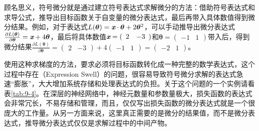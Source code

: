 \vspace{0.5em}

\parinterval 顾名思义，符号微分就是通过建立符号表达式求解微分的方法：借助符号表达式和求导公式，推导出目标函数关于自变量的微分表达式，最后再带入具体数值得到微分结果。例如，对于表达式$ L({\bm \theta})={\textbf{\em x}}\cdot {\bm \theta}+2{\bm \theta}^2 $，可以手动推导出微分表达式$ \frac{\partial L({\bm \theta})}{\partial {\bm \theta}}=\textbf{\em x}+4{\bm \theta}  $，最后将具体数值$ \textbf{\em x} = {(\begin{array}{cc} 2 & -3\end{array})} $和$ {\bm \theta} = {(\begin{array}{cc} -1 & 1\end{array})} $带入后，得到微分结果$\frac{\partial L({\bm \theta})}{\partial {\bm \theta}}= {(\begin{array}{cc} 2 & -3\end{array})}+4{(\begin{array}{cc} -1 & 1\end{array})}= {(\begin{array}{cc} -2 & 1\end{array})}$。

\parinterval  使用这种求梯度的方法，要求必须将目标函数转化成一种完整的数学表达式，这个过程中存在{\small{}}（Expression Swell）的问题，很容易导致符号微分求解的表达式急速“膨胀”，大大增加系统存储和处理表达式的负担。关于这个问题的一个实例请看表\ref{tab:9-4}。在深层的神经网络中，神经元数量和参数量极大，损失函数的表达式会非常冗长，不易存储和管理，而且，仅仅写出损失函数的微分表达式就是一个很庞大的工作量。从另一方面来说，这里真正需要的是微分的结果值，而不是微分表达式，推导微分表达式仅仅是求解过程中的中间产物。

